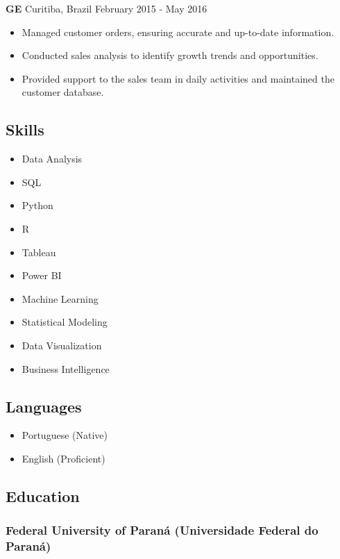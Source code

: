 \documentclass[
]{article}
\providecommand{\tightlist}{%
  \setlength{\itemsep}{0pt}\setlength{\parskip}{0pt}}
\begin{document}
\textbf{GE} \textbar{} Curitiba, Brazil \textbar{} February 2015 - May
2016

\begin{itemize}
\tightlist
\item
  Managed customer orders, ensuring accurate and up-to-date information.
\item
  Conducted sales analysis to identify growth trends and opportunities.
\item
  Provided support to the sales team in daily activities and maintained
  the customer database.
\end{itemize}

\subsection{Skills}\label{skills}

\begin{itemize}
\tightlist
\item
  Data Analysis
\item
  SQL
\item
  Python
\item
  R
\item
  Tableau
\item
  Power BI
\item
  Machine Learning
\item
  Statistical Modeling
\item
  Data Visualization
\item
  Business Intelligence
\end{itemize}

\subsection{Languages}\label{languages}

\begin{itemize}
\tightlist
\item
  Portuguese (Native)
\item
  English (Proficient)
\end{itemize}

\subsection{Education}\label{education}

\subsubsection{Federal University of Paraná (Universidade Federal do
Paraná)}\label{federal-university-of-paranuxe1-universidade-federal-do-paranuxe1}
\end{document}
